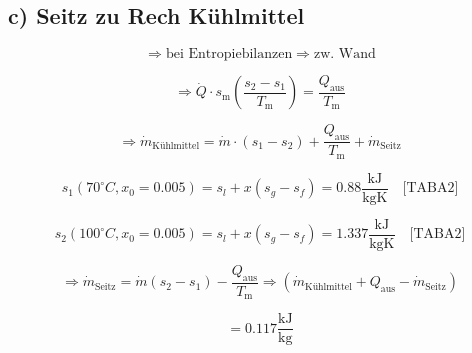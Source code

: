 \subsection*{c) Seitz zu Rech Kühlmittel}

\[
\Rightarrow \text{bei Entropiebilanzen} \Rightarrow \text{zw. Wand}
\]

\[
\Rightarrow \dot{Q} \cdot s_{\text{m}} \left( \frac{s_2 - s_1}{T_{\text{m}}} \right) = \frac{Q_{\text{aus}}}{T_{\text{m}}}
\]

\[
\Rightarrow \dot{m}_{\text{Kühlmittel}} = \dot{m} \cdot (s_1 - s_2) + \frac{Q_{\text{aus}}}{T_{\text{m}}} + \dot{m}_{\text{Seitz}}
\]

\[
s_1 (70^\circ C, x_0 = 0.005) = s_{l} + x (s_{g} - s_{f}) = 0.88 \frac{\text{kJ}}{\text{kgK}} \quad \text{[TABA2]}
\]

\[
s_2 (100^\circ C, x_0 = 0.005) = s_{l} + x (s_{g} - s_{f}) = 1.337 \frac{\text{kJ}}{\text{kgK}} \quad \text{[TABA2]}
\]

\[
\Rightarrow \dot{m}_{\text{Seitz}} = \dot{m} (s_2 - s_1) - \frac{Q_{\text{aus}}}{T_{\text{m}}} \Rightarrow \left( \dot{m}_{\text{Kühlmittel}} + Q_{\text{aus}} - \dot{m}_{\text{Seitz}} \right)
\]

\[
= 0.117 \frac{\text{kJ}}{\text{kg}}
\]